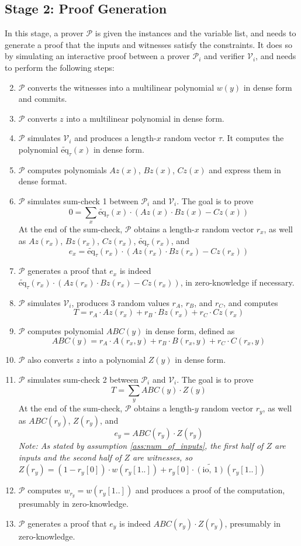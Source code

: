 \documentclass{article}
\renewcommand{\P}{\mathcal{P}}
\newcommand{\V}{\mathcal{V}}
\newcommand{\eq}{\widetilde{\mbox{eq}}}
\newcommand{\io}{\widetilde{(\mbox{io, 1})}}
\begin{document}
\subsection{Stage 2: Proof Generation}
In this stage, a prover $\P$ is given the instances and the variable list, and needs to generate a proof that the inputs and witnesses satisfy the constraints. It does so by simulating an interactive proof between a prover $\P_i$ and verifier $\V_i$, and needs to perform the following steps:
\begin{enumerate}
    \setcounter{enumi}{1}
    \item $\P$ converts the witnesses into a multilinear polynomial $w(y)$ in dense form and commits.
    \item $\P$ converts $z$ into a multilinear polynomial in dense form.
    \item $\P$ simulates $\V_i$ and produces a length-$x$ random vector $\tau$. It computes the polynomial $\eq_\tau(x)$ in dense form.
    \item $\P$ computes polynomials $Az(x)$, $Bz(x)$, $Cz(x)$ and express them in dense format.
    \item $\P$ simulates sum-check 1 between $\P_i$ and $\V_i$. The goal is to prove
    $$\displaystyle0 =\sum_x \eq_\tau(x)\cdot (Az(x)\cdot Bz(x) - Cz(x))$$
    At the end of the sum-check, $\P$ obtains a length-$x$ random vector $r_x$, as well as $Az(r_x)$, $Bz(r_x)$, $Cz(r_x)$, $\eq_\tau(r_x)$, and
    $$e_x = \eq_\tau(r_x)\cdot (Az(r_x)\cdot Bz(r_x) - Cz(r_x))$$
    \item $\P$ generates a proof that $e_x$ is indeed $\eq_\tau(r_x)\cdot (Az(r_x)\cdot Bz(r_x) - Cz(r_x))$, in zero-knowledge if necessary.\label{step_spartan:p_proof_1}
    \item $\P$ simulates $\V_i$, produces 3 random values $r_A$, $r_B$, and $r_C$, and computes 
    $$T = r_A\cdot Az(r_x) + r_B\cdot Bz(r_x) + r_C\cdot Cz(r_x)$$
    \item $\P$ computes polynomial $ABC(y)$ in dense form, defined as
    $$ABC(y) = r_A\cdot A(r_x, y) + r_B\cdot B(r_x, y) + r_C\cdot C(r_x, y)$$
    \item $\P$ also converts $z$ into a polynomial $Z(y)$ in dense form.
    \item $\P$ simulates sum-check 2 between $\P_i$ and $\V_i$. The goal is to prove
    $$\displaystyle T = \sum_y ABC(y)\cdot Z(y)$$
    At the end of the sum-check, $\P$ obtains a length-$y$ random vector $r_y$, as well as $ABC(r_y)$, $Z(r_y)$, and
    $$e_y = ABC(r_y)\cdot Z(r_y)$$
    \emph{Note: As stated by assumption \ref{ass:num_of_inputs}, the first half of $Z$ are inputs and the second half of $Z$ are witnesses, so $Z(r_y) = (1 - r_y[0])\cdot w(r_y[1..]) + r_y[0]\cdot \io(r_y[1..])$}
    \item $\P$ computes $w_{r_y} = w(r_y[1..])$ and produces a proof of the computation, presumably in zero-knowledge.\label{step_spartan:p_proof_2}
    \item $\P$ generates a proof that $e_y$ is indeed $ABC(r_y)\cdot Z(r_y)$, presumably in zero-knowledge.\label{step_spartan:p_proof_3}
\end{enumerate}
\end{document}
